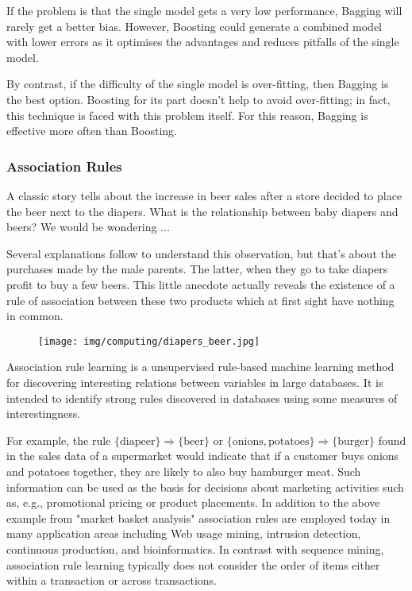 	If the problem is that the single model gets a very low performance, Bagging will rarely get a better bias. However, Boosting could generate a combined model with lower errors as it optimises the advantages and reduces pitfalls of the single model.

	By contrast, if the difficulty of the single model is over-fitting, then Bagging is the best option. Boosting for its part doesn’t help to avoid over-fitting; in fact, this technique is faced with this problem itself. For this reason, Bagging is effective more often than Boosting.
	
	\pagebreak
	\subsubsection{Association Rules}
	A classic story tells about the increase in beer sales after a store decided to place the beer next to the diapers. What is the relationship between baby diapers and beers? We would be wondering ...
	
	Several explanations follow to understand this observation, but that's about the purchases made by the male parents. The latter, when they go to take diapers profit to buy a few beers. This little anecdote actually reveals the existence of a rule of association between these two products which at first sight have nothing in common.
	\begin{figure}[H]
		\centering
		\texttt{[image: img/computing/diapers\_beer.jpg]}
	\end{figure}
	
	Association rule learning is a unsupervised rule-based machine learning method for discovering interesting relations between variables in large databases. It is intended to identify strong rules discovered in databases using some measures of interestingness.
	
	 For example, the rule  ${\displaystyle \{\mathrm {diapeer} \}\Rightarrow \{\mathrm {beer} \}}$ or ${\displaystyle \{\mathrm {onions,potatoes} \}\Rightarrow \{\mathrm {burger} \}}$  found in the sales data of a supermarket would indicate that if a customer buys onions and potatoes together, they are likely to also buy hamburger meat. Such information can be used as the basis for decisions about marketing activities such as, e.g., promotional pricing or product placements. In addition to the above example from "market basket analysis" association rules are employed today in many application areas including Web usage mining, intrusion detection, continuous production, and bioinformatics. In contrast with sequence mining, association rule learning typically does not consider the order of items either within a transaction or across transactions.
	
